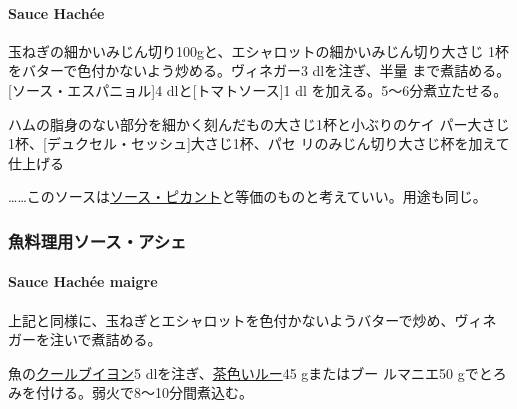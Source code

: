 \begin{recette}
\hypertarget{sauce-hachee}{%
\paragraph{Sauce Hachée}\label{sauce-hachee}}


玉ねぎの細かいみじん切り100gと、エシャロットの細かいみじん切り大さじ
1\undemi{}杯をバターで色付かないよう炒める。ヴィネガー3 dlを注ぎ、半量
まで煮詰める。{[}ソース・エスパニョル{]}4
dlと{[}トマトソース{]}1\undemi{} dl を加える。5〜6分煮立たせる。

ハムの脂身のない部分を細かく刻んだもの大さじ1\undemi{}杯と小ぶりのケイ
パー大さじ1\undemi{}杯、{[}デュクセル・セッシュ{]}大さじ1\undemi{}杯、パセ
リのみじん切り大さじ\undemi{}杯を加えて仕上げる

\ldots{}\ldots{}このソースは\protect\hyperlink{ux30bdux30fcux30b9ux30d4ux30abux30f3ux30c8}{ソース・ピカント}と等価のものと考えていい。用途も同じ。

\maeaki

\hypertarget{ux9b5aux6599ux7406ux7528ux30bdux30fcux30b9ux30a2ux30b7ux30a7}{%
\subsubsection{魚料理用ソース・アシェ}\label{ux9b5aux6599ux7406ux7528ux30bdux30fcux30b9ux30a2ux30b7ux30a7}}

\hypertarget{sauce-hachee-maigre}{%
\paragraph{Sauce Hachée maigre}\label{sauce-hachee-maigre}}


上記と同様に、玉ねぎとエシャロットを色付かないようバターで炒め、ヴィネ
ガーを注いで煮詰める。

魚の\protect\hyperlink{}{クールブイヨン}5
dlを注ぎ、\protect\hyperlink{roux-brun}{茶色いルー}45 gまたはブー
ルマニエ50 gでとろみを付ける。弱火で8〜10分間煮込む。


\end{recette}
